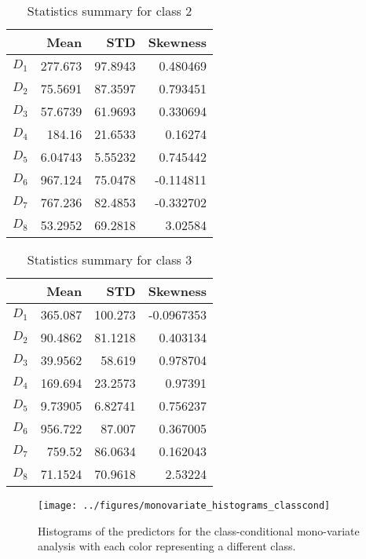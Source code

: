 \documentclass[conference]{IEEEtran}
\begin{document}
  \begin{table}[htp]
    \caption{Statistics summary for class 2}
      \centering
      \begin{tabular}{@{} crrr @{}}
        \toprule
         & Mean & STD & Skewness \\ 
        \midrule
        $D_1$ & 277.673  &  97.8943  &  0.480469 \\ 
        $D_2$ & 75.5691 &  87.3597  &  0.793451\\ 
        $D_3$ & 57.6739 &  61.9693  &  0.330694 \\ 
        $D_4$ & 184.16   &  21.6533 &   0.16274 \\ 
        $D_5$ & 6.04743  & 5.55232  & 0.745442 \\ 
        $D_6$ & 967.124 &   75.0478  & -0.114811 \\ 
        $D_7$ & 767.236  &  82.4853 &  -0.332702 \\ 
        $D_8$ & 53.2952  & 69.2818  &  3.02584 \\       
        \bottomrule
      \end{tabular}
    \label{statistics_table_class_2}
    \end{table}%

    \begin{table}[htp]
      \caption{Statistics summary for class 3}
        \centering
        \begin{tabular}{@{} crrr @{}}
          \toprule
           & Mean & STD & Skewness \\ 
          \midrule
          $D_1$ & 365.087  &  100.273  &  -0.0967353 \\ 
          $D_2$ & 90.4862  &  81.1218  &  0.403134 \\ 
          $D_3$ & 39.9562 &   58.619   &  0.978704 \\ 
          $D_4$ & 169.694  &   23.2573  &  0.97391 \\ 
          $D_5$ & 9.73905  &  6.82741  & 0.756237 \\ 
          $D_6$ & 956.722   &  87.007  &   0.367005 \\ 
          $D_7$ & 759.52   &   86.0634  &  0.162043 \\ 
          $D_8$ & 71.1524   & 70.9618  &  2.53224 \\       
          \bottomrule
        \end{tabular}
      \label{statistics_table_class_3}
      \end{table}%


\begin{figure}[htbp]
\vskip-5pt
\centerline{\texttt{[image: ../figures/monovariate\_histograms\_classcond]}}
\caption{Histograms of the predictors for the class-conditional mono-variate analysis with each color representing a different class.}
\label{classcond_monovariate}
\end{figure}
\end{document}
